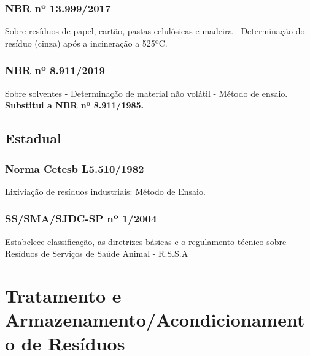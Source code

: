 \begin{subapend}
\begin{subsubapend}
		\subsubsection{NBR nº 13.999/2017}
		Sobre resíduos de papel, cartão, pastas celulósicas e madeira - Determinação do resíduo (cinza) após a incineração a 525ºC.
		\subsubsection{NBR nº 8.911/2019}
		Sobre solventes - Determinação de material não volátil - Método de ensaio. \textbf{Substitui a NBR nº 8.911/1985.}
	\end{subsubapend}
\end{subapend}

\begin{subapend}
	\subsection{Estadual}
	\begin{subsubapend}
		\item \subsubsection{Norma Cetesb L5.510/1982}
		Lixiviação de resíduos industriais: Método de Ensaio.
		\subsubsection{SS/SMA/SJDC-SP nº 1/2004}
		Estabelece classificação, as diretrizes básicas e o regulamento técnico sobre Resíduos de Serviços de Saúde Animal - R.S.S.A
	\end{subsubapend}
\end{subapend}

\section{Tratamento e Armazenamento/Acondicionamento de Resíduos}

